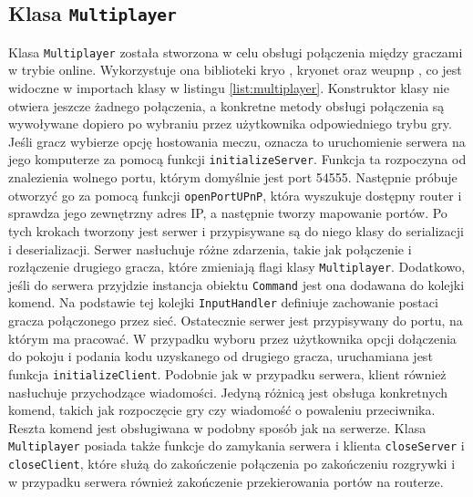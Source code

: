 \subsection{Klasa \texttt{Multiplayer}}
Klasa \texttt{Multiplayer} została stworzona w celu obsługi połączenia między graczami w trybie online. Wykorzystuje ona biblioteki kryo \cite{Kryo}, kryonet \cite{Kryonet} oraz weupnp \cite{weupnp}, co jest widoczne w importach klasy w listingu \ref{list:multiplayer}. Konstruktor klasy nie otwiera jeszcze żadnego połączenia, a konkretne metody obsługi połączenia są wywoływane dopiero po wybraniu przez użytkownika odpowiedniego trybu gry. 
Jeśli gracz wybierze opcję hostowania meczu, oznacza to uruchomienie serwera na jego komputerze za pomocą funkcji \texttt{initializeServer}. Funkcja ta rozpoczyna od znalezienia wolnego portu, którym domyślnie jest port 54555. Następnie próbuje otworzyć go za pomocą funkcji \texttt{openPortUPnP}, która wyszukuje dostępny router i sprawdza jego zewnętrzny adres IP, a następnie tworzy mapowanie portów. Po tych krokach tworzony jest serwer i przypisywane są do niego klasy do serializacji i deserializacji. Serwer nasłuchuje różne zdarzenia, takie jak połączenie i rozłączenie drugiego gracza, które zmieniają flagi klasy \texttt{Multiplayer}. Dodatkowo, jeśli do serwera przyjdzie instancja obiektu \texttt{Command} jest ona dodawana do kolejki komend. Na podstawie tej kolejki \texttt{InputHandler} definiuje zachowanie postaci gracza połączonego przez sieć. Ostatecznie serwer jest przypisywany do portu, na którym ma pracować. 
W przypadku wyboru przez użytkownika opcji dołączenia do pokoju i podania kodu uzyskanego od drugiego gracza, uruchamiana jest funkcja \texttt{initializeClient}. Podobnie jak w przypadku serwera, klient również nasłuchuje przychodzące wiadomości. Jedyną różnicą jest obsługa konkretnych komend, takich jak rozpoczęcie gry czy wiadomość o powaleniu przeciwnika. Reszta komend jest obsługiwana w podobny sposób jak na serwerze. 
Klasa \texttt{Multiplayer} posiada także funkcje do zamykania serwera i klienta \texttt{closeServer} i \texttt{closeClient}, które służą do zakończenie połączenia po zakończeniu rozgrywki i w przypadku serwera również zakończenie przekierowania portów na routerze.

